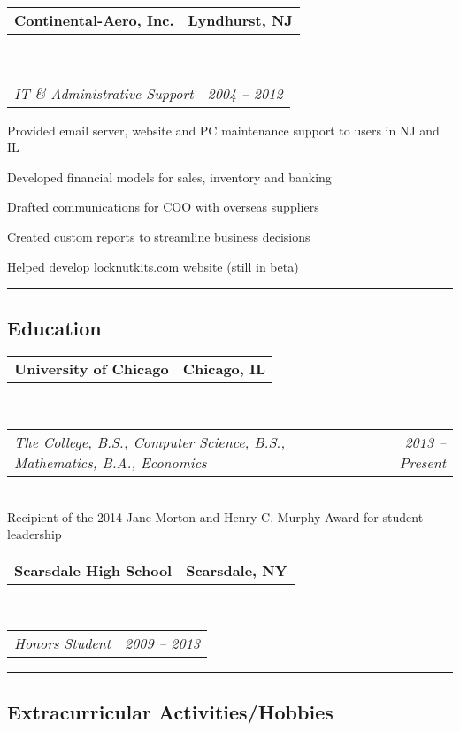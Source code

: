 \documentclass[10pt,letterpaper]{article}
\makeatletter
\newcommand{\headerrow}[2]
{\noindent \begin{tabular*}{\linewidth}{l@{\extracolsep{\fill}}r}
	#1 &
	#2 \\
\end{tabular*}}
\newcommand{\ahref}[1]
{\href{http://#1}{#1}}
\makeatother
\begin{document}
	\headerrow
		{\textbf{Continental-Aero, Inc.}}
		{\textbf{Lyndhurst, NJ}}
	\\
	\headerrow
		{\emph{IT \& Administrative Support}}
		{\emph{2004 -- 2012}}
	\begin{itemize*}
		\item Provided email server, website and PC maintenance support to users in NJ and IL
		\item Developed financial models for sales, inventory and banking
		\item Drafted communications for COO with overseas suppliers
		\item Created custom reports to streamline business decisions
		\item Helped develop \ahref{locknutkits.com} website (still in beta)
	\end{itemize*}


\vspace{0.4em}
\hrule
\vspace{-0.4em}
\subsection*{Education}

	\headerrow
		{\textbf{University of Chicago}}
		{\textbf{Chicago, IL}}
	\\
	\headerrow
		{\emph{The College, B.S., Computer Science, B.S., Mathematics, B.A., Economics}}
		{\emph{2013 -- Present}}
	\\
	Recipient of the 2014 Jane Morton and Henry C. Murphy Award for student leadership

	\headerrow
		{\textbf{Scarsdale High School}}
		{\textbf{Scarsdale, NY}}
	\\
	\headerrow
		{\emph{Honors Student}}
		{\emph{2009 -- 2013}}

\vspace{0.8em}
\hrule
\vspace{-0.4em}
\subsection*{Extracurricular Activities/Hobbies}
\end{document}
